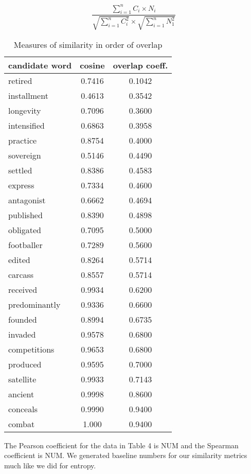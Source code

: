 \documentclass[11pt]{article}
\begin{document}
\begin{description}
\[  \frac{\displaystyle \sum_{i=1}^n C_i \times N_i}
	{\sqrt{\displaystyle \sum_{i=1}^n C_i^2} \times \sqrt{ \displaystyle \sum_{i=1}^n N_1^2}} \]
	
\begin{table}
\centering
\begin{tabular}{l | c | c }
candidate word & cosine & overlap coeff. \\
\hline
retired & 0.7416 & 0.1042 \\
installment & 0.4613 & 0.3542 \\
longevity & 0.7096 & 0.3600 \\
intensified & 0.6863 & 0.3958 \\
practice & 0.8754 & 0.4000 \\
sovereign & 0.5146 & 0.4490 \\
settled & 0.8386 & 0.4583 \\
express & 0.7334 & 0.4600 \\
antagonist & 0.6662 & 0.4694 \\
published & 0.8390 & 0.4898 \\
obligated & 0.7095 & 0.5000 \\
footballer & 0.7289 & 0.5600 \\
edited & 0.8264 & 0.5714 \\
carcass & 0.8557 & 0.5714 \\
received & 0.9934 & 0.6200 \\
predominantly & 0.9336 & 0.6600 \\
founded & 0.8994 & 0.6735 \\
invaded & 0.9578 & 0.6800 \\
competitions & 0.9653 & 0.6800 \\
produced & 0.9595 & 0.7000 \\
satellite & 0.9933 & 0.7143 \\
ancient & 0.9998 & 0.8600 \\
conceals & 0.9990 & 0.9400 \\
combat & 1.000 & 0.9400 \\
\end{tabular}
\caption{Measures of similarity in order of overlap}
\label{tab:myfirsttable}
\end{table}

The Pearson coefficient for the data in Table 4 is NUM and the Spearman coefficient is NUM. We generated baseline numbers for our similarity metrics much like we did for entropy.

\end{description}
 
\end{document}
